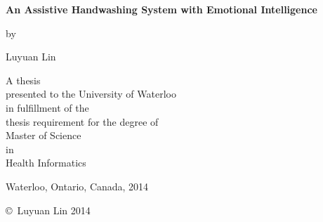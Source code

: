 
\pagestyle{empty}

\begin{titlepage}
        \begin{center}
        \vspace*{1.0cm}

        \Huge
        {\bf An Assistive Handwashing System with Emotional Intelligence }
        
        \vspace*{1.0cm}

        \normalsize
        by \\

        \vspace*{1.0cm}

        \Large
        Luyuan Lin \\

        \vspace*{3.0cm}

        \normalsize
        A thesis \\
        presented to the University of Waterloo \\ 
        in fulfillment of the \\
        thesis requirement for the degree of \\
        Master of Science \\
        in \\
        Health Informatics \\

        \vspace*{2.0cm}

        Waterloo, Ontario, Canada, 2014 \\

        \vspace*{1.0cm}

        \copyright\ Luyuan Lin 2014 \\
        \end{center}
\end{titlepage}

\pagestyle{plain}
\setcounter{page}{2}

